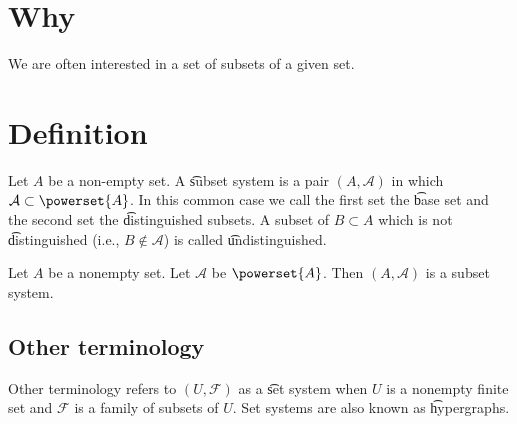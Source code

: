 
\section*{Why}

We are often interested in a set of subsets of a given set.

\section*{Definition}

Let $A$ be a non-empty set.
A \t{subset system} is a pair $(A, \mathcal{A} )$ in which $\mathcal{A}  \subset \powerset{A}$.
In this common case we call the first set the \t{base set} and the second set the \t{distinguished subsets}.
A subset of $B \subset A$ which is not \t{distinguished} (i.e., $B \not\in \mathcal{A} $) is called \t{undistinguished}.

\begin{example}
Let $A$ be a nonempty set.
Let $\mathcal{A} $ be $\powerset{A}$.
Then $(A, \mathcal{A} )$ is a subset system.
\end{example}

\subsection*{Other terminology}

Other terminology refers to $(U, \mathcal{F} )$ as a \t{set system} when $U$ is a nonempty finite set and $\mathcal{F} $ is a family of subsets of $U$.
Set systems are also known as \t{hypergraphs}.


\blankpage
